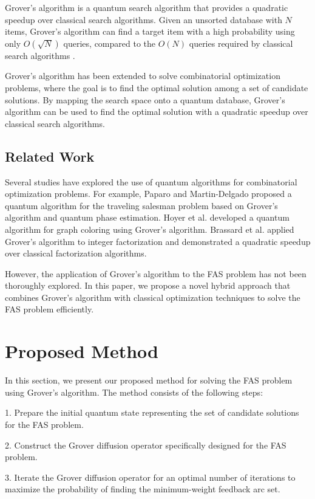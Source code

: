 Grover's algorithm is a quantum search algorithm that provides a quadratic speedup over classical search algorithms. Given an unsorted database with $N$ items, Grover's algorithm can find a target item with a high probability using only $O(\sqrt{N})$ queries, compared to the $O(N)$ queries required by classical search algorithms \cite{Grover1996}.

Grover's algorithm has been extended to solve combinatorial optimization problems, where the goal is to find the optimal solution among a set of candidate solutions. By mapping the search space onto a quantum database, Grover's algorithm can be used to find the optimal solution with a quadratic speedup over classical search algorithms.

\subsection{Related Work}

Several studies have explored the use of quantum algorithms for combinatorial optimization problems. For example, Paparo and Martin-Delgado \cite{Paparo2013} proposed a quantum algorithm for the traveling salesman problem based on Grover's algorithm and quantum phase estimation. Hoyer et al. \cite{Hoyer1999} developed a quantum algorithm for graph coloring using Grover's algorithm. Brassard et al. \cite{Brassard1998} applied Grover's algorithm to integer factorization and demonstrated a quadratic speedup over classical factorization algorithms.

However, the application of Grover's algorithm to the FAS problem has not been thoroughly explored. In this paper, we propose a novel hybrid approach that combines Grover's algorithm with classical optimization techniques to solve the FAS problem efficiently.

\section{Proposed Method}
\label{sec:method}

In this section, we present our proposed method for solving the FAS problem using Grover's algorithm. The method consists of the following steps:

1. Prepare the initial quantum state representing the set of candidate solutions for the FAS problem.

2. Construct the Grover diffusion operator specifically designed for the FAS problem.

3. Iterate the Grover diffusion operator for an optimal number of iterations to maximize the probability of finding the minimum-weight feedback arc set.

